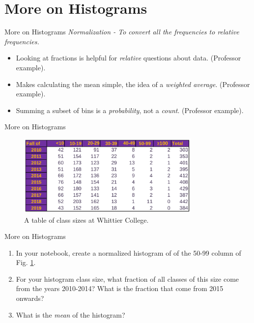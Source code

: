 \documentclass{beamer}
\begin{document}
\section{More on Histograms}

\begin{frame}{More on Histograms}
\textit{\alert{Normalization} - To convert all the frequencies to relative frequencies.}
\begin{itemize}
\item Looking at fractions is helpful for \textit{relative} questions about data. (Professor example).
\item Makes calculating the mean simple, the idea of a \textit{weighted average}. (Professor example).
\item Summing a subset of bins is a \textit{probability}, not a \textit{count}. (Professor example).
\end{itemize}
\end{frame}

\begin{frame}{More on Histograms}
\begin{figure}
\centering
\includegraphics[width=0.8\textwidth]{figures/class_size.png}
\caption{\label{fig:class_size} A table of class sizes at Whittier College.}
\end{figure}
\end{frame}

\begin{frame}{More on Histograms}
\begin{enumerate}
\item In your notebook, create a normalized histogram of of the 50-99 column of Fig. \ref{fig:class_size}.
\item For your histogram class size, what fraction of all classes of this size come from the years 2010-2014?  What is the fraction that come from 2015 onwards?
\item What is the \textit{mean} of the histogram?
\end{enumerate}
\end{frame}
\end{document}
